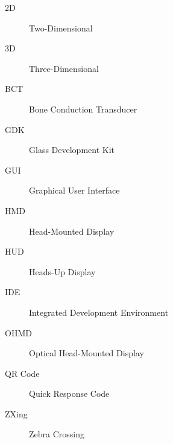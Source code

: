 \begin{description}
	\item [2D] Two-Dimensional
	\item [3D] Three-Dimensional
	\item [BCT] Bone Conduction Transducer
	\item [GDK] Glass Development Kit
	\item [GUI] Graphical User Interface
	\item [HMD] Head-Mounted Display
	\item [HUD] Heads-Up Display
	\item [IDE] Integrated Development Environment
	\item [OHMD] Optical Head-Mounted Display
	\item [QR Code] Quick Response Code
	\item [ZXing] Zebra Crossing
\end{description}